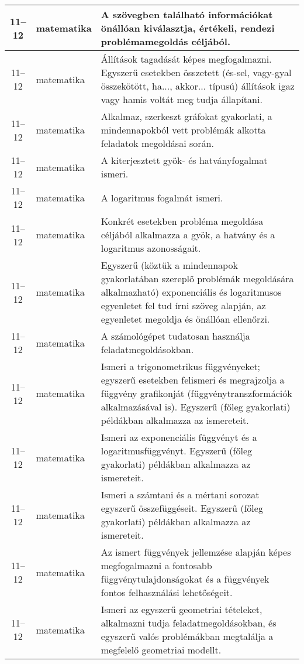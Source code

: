 \begin{small}
\begin{longtable}{c | p{2cm} |  p{11cm} }
              11--12 & matematika & A szövegben található információkat önállóan kiválasztja, értékeli, rendezi problémamegoldás céljából. \\ \hline
              11--12 & matematika & Állítások tagadását képes megfogalmazni. Egyszerű esetekben összetett (és-sel, vagy-gyal összekötött, ha..., akkor... típusú) állítások igaz vagy hamis voltát meg tudja állapítani. \\ \hline
              11--12 & matematika & Alkalmaz, szerkeszt gráfokat gyakorlati, a mindennapokból vett problémák alkotta feladatok megoldásai során. \\ \hline
              11--12 & matematika & A kiterjesztett gyök- és hatványfogalmat ismeri. \\ \hline
              11--12 & matematika & A logaritmus fogalmát ismeri. \\ \hline
              11--12 & matematika & Konkrét esetekben probléma megoldása céljából  alkalmazza a gyök, a hatvány és a logaritmus azonosságait. \\ \hline
              11--12 & matematika & Egyszerű (köztük a mindennapok gyakorlatában szereplő problémák megoldására alkalmazható) exponenciális és logaritmusos egyenletet fel tud írni szöveg alapján, az egyenletet megoldja és önállóan ellenőrzi. \\ \hline
              11--12 & matematika & A számológépet tudatosan használja feladatmegoldásokban. \\ \hline
              11--12 & matematika & Ismeri a trigonometrikus függvényeket; egyszerű esetekben felismeri és megrajzolja a függvény grafikonját (függvénytranszformációk alkalmazásával is). Egyszerű (főleg gyakorlati) példákban alkalmazza az ismereteit. \\ \hline
              11--12 & matematika & Ismeri az exponenciális függvényt és a logaritmusfüggvényt. Egyszerű (főleg gyakorlati) példákban alkalmazza az ismereteit. \\ \hline
              11--12 & matematika & Ismeri a számtani és a mértani sorozat egyszerű összefüggéseit. Egyszerű (főleg gyakorlati) példákban alkalmazza az ismereteit. \\ \hline
              11--12 & matematika & Az ismert függvények jellemzése alapján képes megfogalmazni a fontosabb függvénytulajdonságokat és a függvények fontos felhasználási lehetőségeit. \\ \hline
              11--12 & matematika & Ismeri az egyszerű geometriai tételeket, alkalmazni tudja feladatmegoldásokban, és egyszerű valós problémákban megtalálja a megfelelő geometriai modellt. \\ \hline

\end{longtable}
\end{small}
